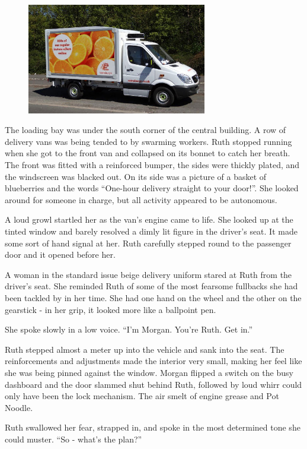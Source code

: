 \begin{figure}[h!]
\centering
\includegraphics[width=0.7\textwidth]{./pictures/van_small}
\end{figure}

The loading bay was under the south corner of the central building. A row of delivery vans was being tended to by swarming workers. Ruth stopped running when she got to the front van and collapsed on its bonnet to catch her breath. The front was fitted with a reinforced bumper, the sides were thickly plated, and the windscreen was blacked out. On its side was a picture of a basket of blueberries and the words “One-hour delivery straight to your door!”. She looked around for someone in charge, but all activity appeared to be autonomous. 

A loud growl startled her as the van’s engine came to life. She looked up at the tinted window and barely resolved a dimly lit figure in the driver’s seat. It made some sort of hand signal at her. Ruth carefully stepped round to the passenger door and it opened before her.

A woman in the standard issue beige delivery uniform stared at Ruth from the driver’s seat.  She reminded Ruth of some of the most fearsome fullbacks she had been tackled by in her time. She had one hand on the wheel and the other on the gearstick - in her grip, it looked more like a ballpoint pen. 

She spoke slowly in a low voice. “I’m Morgan. You’re Ruth. Get in.” 

Ruth stepped almost a meter up into the vehicle and sank into the seat. The reinforcements and adjustments made the interior very small, making her feel like she was being pinned against the window. Morgan flipped a switch on the busy dashboard and the door slammed shut behind Ruth, followed by loud whirr could only have been the lock mechanism. The air smelt of engine grease and Pot Noodle. 

Ruth swallowed her fear, strapped in, and spoke in the most determined tone she could muster. “So - what’s the plan?”


